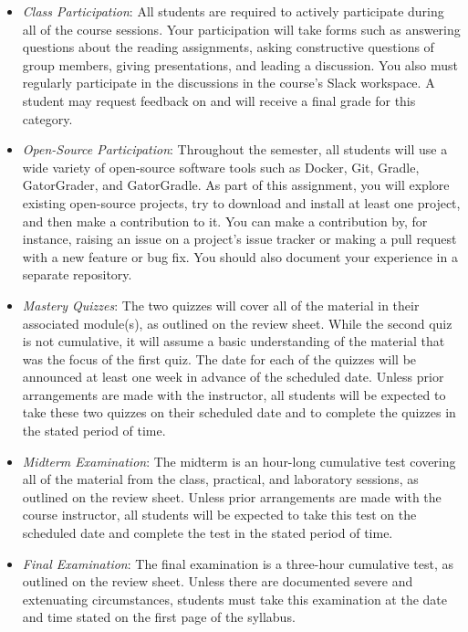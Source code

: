\documentclass[11pt]{article}
\begin{document}
\begin{itemize}

  \item {\em Class Participation\/}: All students are required to actively
    participate during all of the course sessions. Your participation will take
    forms such as answering questions about the reading assignments, asking
    constructive questions of group members, giving presentations, and leading a
    discussion. You also must regularly participate in the discussions in the
    course's Slack workspace. A student may request feedback on and will receive a
    final grade for this category.

  \item {\em Open-Source Participation\/}: Throughout the semester, all students
    will use a wide variety of open-source software tools such as Docker, Git,
    Gradle, GatorGrader, and GatorGradle. As part of this assignment, you will
    explore existing open-source projects, try to download and install at least
    one project, and then make a contribution to it. You can make a contribution
    by, for instance, raising an issue on a project's issue tracker or making a
    pull request with a new feature or bug fix. You should also document your
    experience in a separate repository.

  \item {\em Mastery Quizzes\/}: The two quizzes will cover all of the material
    in their associated module(s), as outlined on the review sheet. While the
    second quiz is not cumulative, it will assume a basic understanding of the
    material that was the focus of the first quiz. The date for each of the
    quizzes will be announced at least one week in advance of the scheduled
    date. Unless prior arrangements are made with the instructor, all students
    will be expected to take these two quizzes on their scheduled date and to
    complete the quizzes in the stated period of time.

  \item {\em Midterm Examination\/}: The midterm is an hour-long cumulative test
    covering all of the material from the class, practical, and laboratory
    sessions, as outlined on the review sheet. Unless prior arrangements are
    made with the course instructor, all students will be expected to take this
    test on the scheduled date and complete the test in the stated period of
    time.

  \item {\em Final Examination\/}: The final examination is a three-hour
    cumulative test, as outlined on the review sheet. Unless there are
    documented severe and extenuating circumstances, students must take this
    examination at the date and time stated on the first page of the syllabus.


\end{itemize}
\end{document}
